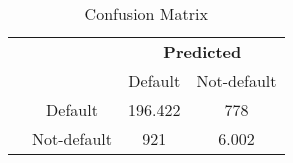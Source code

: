 \begin{table}[H]
     \centering
     \caption{Confusion Matrix}
     \label{tab:Confusion_matrix}
     \begin{tabular}{@{}cc cc@{}}
     \multicolumn{1}{c}{} &\multicolumn{1}{c}{} &\multicolumn{2}{c}{\textbf{Predicted}} \\
     \cmidrule(lr){3-4}
     \multicolumn{1}{c}{} & 
     \multicolumn{1}{c}{} & 
     \multicolumn{1}{c}{Default} & 
     \multicolumn{1}{c}{Not-default} \\
     \vspace{0.1cm}
     \cline{2-4}
     \multirow[c]{2}{*}{\rotatebox[origin=tr]{90}{\textbf{Actual}}} & Default  & 196.422&778 \\[1.5ex] & Not-default &921&6.002 \\ \cline{2-4}
     \end{tabular}
     \end{table}